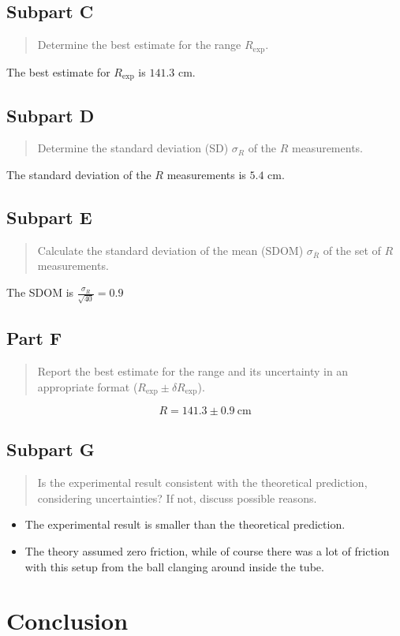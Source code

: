 \documentclass[8pt]{extarticle}
\newcommand{\plain}[1]{\textrm{#1}}
\begin{document}
{\subsection*{Subpart C}
\begin{quote}
	Determine the best estimate for the range $ R_{\plain{exp}} $.
\end{quote}
The best estimate for $R_{\plain{exp}}$ is $141.3$ cm.
\subsection*{Subpart D}
\begin{quote}
	Determine the standard deviation (SD) $ \sigma_R $ of the $ R $ measurements.
\end{quote}
The standard deviation of the $R$ measurements is $5.4$ cm.
\subsection*{Subpart E}
\begin{quote}
	Calculate the standard deviation of the mean (SDOM) $ \sigma_{\overline{R}} $ of the set of $ R $ measurements.
\end{quote}
The SDOM is $ \frac{\sigma_{R}}{\sqrt{40}}  = 0.9$
\subsection*{Part F}
\begin{quote}
	Report the best estimate for the range and its uncertainty in an appropriate format ($ R_{\plain{exp}} \pm \delta R_{\plain{exp}} $).
\end{quote}
\[ R = 141.3 \pm 0.9~\plain{cm} \]
\subsection*{Subpart G}
\begin{quote}
	Is the experimental result consistent with the theoretical prediction, considering uncertainties?  If not, discuss possible reasons.
\end{quote}
\begin{itemize}
	\item The experimental result is smaller than the theoretical prediction.
	\item The theory assumed zero friction, while of course there was a lot of friction with this setup from the ball clanging around inside the tube.
\end{itemize}
\section*{Conclusion}
}
\end{document}
